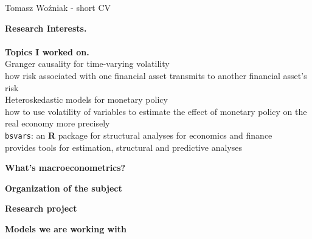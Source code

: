 \documentclass[notes,blackandwhite,mathsans]{beamer}
\begin{document}
{
\begin{frame}{Tomasz Wo\'zniak - short CV}

\textbf{Research Interests.}\\
\\




\vspace{0.5cm}\textbf{Topics I worked on.}\\[0.5ex]
{\small
Granger causality for time-varying volatility \\
{\color{mcxs2}how risk associated with one financial asset transmits to another financial asset's risk}\\[1.5ex]
Heteroskedastic models for monetary policy \\
{\color{mcxs2}how to use volatility of variables to estimate the effect of monetary policy on the real economy more precisely }\\[1.5ex]
\texttt{bsvars}: an \textbf{R} package for structural analyses for economics and finance \\
{\color{mcxs2}provides tools for estimation, structural and predictive analyses }
}
\end{frame}
}




{
\begin{frame}

\bigskip\textbf{\color{mcxs3}What's macroeconometrics?}

\bigskip\textbf{\color{mcxs3}Organization of the subject}

\bigskip\textbf{\color{mcxs1}Research project}

\bigskip\textbf{\color{mcxs3}Models we are working with}

\end{frame}
}
\end{document}
